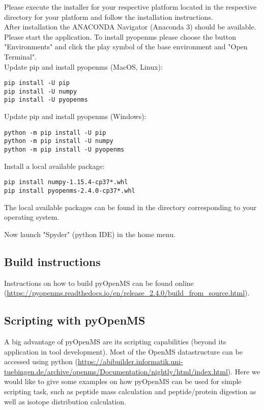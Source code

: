 {\noindent Please execute the installer for your respective platform located in the respective directory for your platform and follow the installation instructions. \\

\noindent After installation the ANACONDA Navigator (Anaconda 3) should be available. Please start the application. To install pyopenms please choose the button "Environments" and click the play symbol of the base environment and "Open Terminal". \\

\noindent  Update pip and install pyopenms (MacOS, Linux):
\begin{lstlisting}
pip install -U pip
pip install -U numpy
pip install -U pyopenms
\end{lstlisting}

\noindent  Update pip and install pyopenms (Windows):
\begin{lstlisting}
python -m pip install -U pip
python -m pip install -U numpy
python -m pip install -U pyopenms
\end{lstlisting}

\noindent Install a local available package:
\begin{lstlisting}
pip install numpy-1.15.4-cp37*.whl
pip install pyopenms-2.4.0-cp37*.whl
\end{lstlisting}

\noindent The local available packages can be found in the directory corresponding to your operating system. 
    
\noindent  Now launch "Spyder" (python IDE) in the home menu.

\subsection{Build instructions}
Instructions on how to build pyOpenMS can be found online (\url{https://pyopenms.readthedocs.io/en/release_2.4.0/build_from_source.html}).

\subsection{Scripting with pyOpenMS}
A big advantage of pyOpenMS are its scripting capabilities (beyond its application in tool development). Most of the OpenMS datastructure can be accessed using python (\url{https://abibuilder.informatik.uni-tuebingen.de/archive/openms/Documentation/nightly/html/index.html}). Here we would like to give some examples on how pyOpenMS can be used for simple scripting task, such as peptide mass calculation and peptide/protein digestion as well as isotope distribution calculation. \\

}
